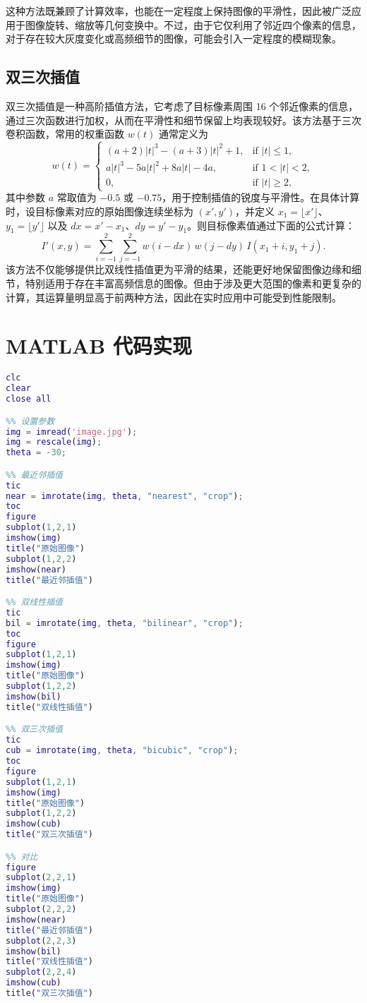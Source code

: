 \documentclass[UTF8]{ctexart}
\begin{document}
这种方法既兼顾了计算效率，也能在一定程度上保持图像的平滑性，因此被广泛应用于图像旋转、缩放等几何变换中。不过，由于它仅利用了邻近四个像素的信息，对于存在较大灰度变化或高频细节的图像，可能会引入一定程度的模糊现象。

\subsection{双三次插值}  
双三次插值是一种高阶插值方法，它考虑了目标像素周围 16 个邻近像素的信息，通过三次函数进行加权，从而在平滑性和细节保留上均表现较好。该方法基于三次卷积函数，常用的权重函数 \(w(t)\) 通常定义为  
\[
w(t) =
\begin{cases}
(a+2)|t|^3 - (a+3)|t|^2 + 1, & \text{if } |t| \le 1,\\[1mm]
a|t|^3 - 5a|t|^2 + 8a|t| - 4a, & \text{if } 1 < |t| < 2,\\[1mm]
0, & \text{if } |t| \ge 2,
\end{cases}
\]
其中参数 \(a\) 常取值为 \(-0.5\) 或 \(-0.75\)，用于控制插值的锐度与平滑性。在具体计算时，设目标像素对应的原始图像连续坐标为 \((x', y')\)，并定义 \(x_1 = \lfloor x' \rfloor\)、\(y_1 = \lfloor y' \rfloor\) 以及 \(dx = x' - x_1\)、\(dy = y' - y_1\)。则目标像素值通过下面的公式计算：  
\[
I'(x, y) = \sum_{i=-1}^{2}\sum_{j=-1}^{2} w(i-dx) \, w(j-dy) \, I(x_1+i, y_1+j).
\]
该方法不仅能够提供比双线性插值更为平滑的结果，还能更好地保留图像边缘和细节，特别适用于存在丰富高频信息的图像。但由于涉及更大范围的像素和更复杂的计算，其运算量明显高于前两种方法，因此在实时应用中可能受到性能限制。

\section{MATLAB 代码实现}

\begin{lstlisting}[language=matlab]
clc
clear
close all

%% 设置参数
img = imread('image.jpg');
img = rescale(img);
theta = -30;

%% 最近邻插值
tic
near = imrotate(img, theta, "nearest", "crop");
toc
figure
subplot(1,2,1)
imshow(img)
title("原始图像")
subplot(1,2,2)
imshow(near)
title("最近邻插值")

%% 双线性插值
tic
bil = imrotate(img, theta, "bilinear", "crop");
toc
figure
subplot(1,2,1)
imshow(img)
title("原始图像")
subplot(1,2,2)
imshow(bil)
title("双线性插值")

%% 双三次插值
tic
cub = imrotate(img, theta, "bicubic", "crop");
toc
figure
subplot(1,2,1)
imshow(img)
title("原始图像")
subplot(1,2,2)
imshow(cub)
title("双三次插值")

%% 对比
figure
subplot(2,2,1)
imshow(img)
title("原始图像")
subplot(2,2,2)
imshow(near)
title("最近邻插值")
subplot(2,2,3)
imshow(bil)
title("双线性插值")
subplot(2,2,4)
imshow(cub)
title("双三次插值")
\end{lstlisting}
\end{document}
